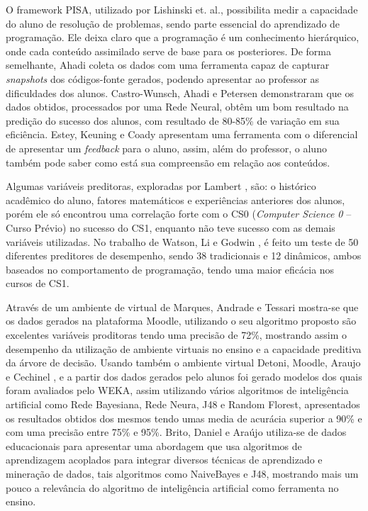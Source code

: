 \documentclass[12pt]{article}
\begin{document}
O framework PISA, utilizado por Lishinski et. al.\cite{Lishinski2016}, possibilita medir a capacidade do aluno de resolução de problemas, sendo parte essencial do aprendizado de programação. Ele deixa claro que a programação é um conhecimento hierárquico, onde cada conteúdo assimilado serve de base para os posteriores. De forma semelhante, Ahadi \cite{Ahadi2016a} coleta os dados com uma ferramenta capaz de capturar \textit{snapshots} dos códigos-fonte gerados, podendo apresentar ao professor as dificuldades dos alunos. Castro-Wunsch, Ahadi e Petersen \cite{Castro-Wunsch2017} demonstraram que os dados obtidos, processados por uma Rede Neural, obtêm um bom resultado na predição do sucesso dos alunos, com resultado de 80-85\% de variação em sua eficiência. %
Estey, Keuning e Coady \cite{Estey2017} apresentam uma ferramenta com o diferencial de apresentar um \textit{feedback} para o aluno, assim, além do professor, o aluno também pode saber como está sua compreensão em relação aos conteúdos.

Algumas variáveis preditoras, exploradas por Lambert \cite{Lambert2015}, são: o histórico acadêmico do aluno, fatores matemáticos e experiências anteriores dos alunos, porém ele só encontrou uma correlação forte com o CS0 (\textit{Computer Science 0} – Curso Prévio) no sucesso do CS1, enquanto não teve sucesso com as demais variáveis utilizadas. No trabalho de Watson, Li e Godwin \cite{Watson2014}, é feito um teste de 50 diferentes preditores de desempenho, sendo 38 tradicionais e 12 dinâmicos, ambos baseados no comportamento de programação, tendo uma maior eficácia nos cursos de CS1.

Através de um ambiente de virtual de Marques, Andrade e Tessari \cite{} mostra-se que os dados gerados na plataforma Moodle, utilizando o seu algoritmo proposto são excelentes variáveis proditoras tendo uma precisão de 72\%, mostrando assim o desempenho da utilização de ambiente virtuais no ensino e a capacidade preditiva da árvore de decisão. Usando também o ambiente virtual Detoni, Moodle, Araujo e Cechinel \cite{Detoni2014}, e a partir dos dados gerados pelo alunos foi gerado modelos dos quais foram avaliados pelo WEKA, assim utilizando vários algoritmos de inteligência artificial como Rede Bayesiana, Rede Neura, J48 e Random Florest, apresentados os resultados obtidos dos mesmos tendo umas media de acurácia superior a 90\% e com uma precisão entre 75\% e 95\%. Brito, Daniel e Araújo \cite{DeBrito2014} utiliza-se de dados educacionais para apresentar uma abordagem que usa algoritmos de aprendizagem acoplados para integrar diversos técnicas de aprendizado e mineração de dados, tais algoritmos como NaiveBayes e J48, mostrando mais um pouco a relevância do algoritmo de inteligência artificial como ferramenta no ensino. 
\end{document}
